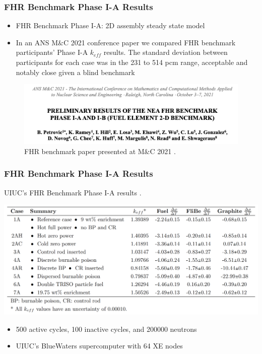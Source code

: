 \begin{frame}
    \frametitle{FHR Benchmark Phase I-A Results}
    \begin{itemize}
        \item FHR Benchmark Phase I-A: 2D assembly steady state model
        \item In an ANS M$\&$C 2021 conference paper 
        we compared FHR benchmark participants' Phase I-A $k_{eff}$ results.  
        The standard deviation between participants for each case 
        was in the 231 to 514 pcm range, acceptable and notably close given a blind 
        benchmark
    \end{itemize}

    \begin{figure}[]
        \centering
        \includegraphics[width=0.85\linewidth]{figures/mnc.png} 
        \caption{FHR benchmark paper presented at M$\&$C 2021 
        \cite{petrovic_preliminary_2021}.}
    \end{figure}
\end{frame}

\begin{frame}
    \frametitle{FHR Benchmark Phase I-A Results}
    \begin{table}
        \caption{UIUC's FHR Benchmark Phase I-A results 
        \cite{chee_arfcfhr-benchmark_2021}.}
        \includegraphics[width=\linewidth]{figures/benchmark-coeff-results.png} 
    \end{table}
    \begin{itemize}
        \item 500 active cycles, 100 inactive cycles, and 200000 neutrons
        \item UIUC's BlueWaters supercomputer with 64 XE nodes
    \end{itemize}
\end{frame}

